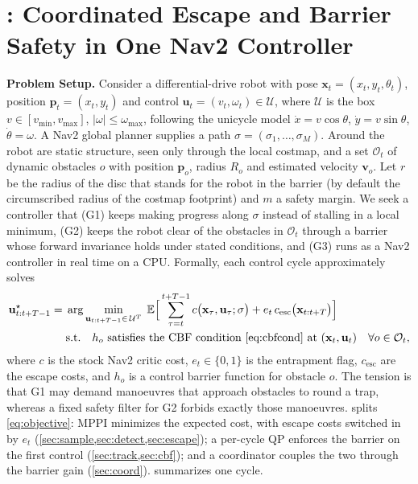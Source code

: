 \section{\sname: Coordinated Escape and Barrier Safety in One Nav2 Controller}\label{sec:method}

\noindent\textbf{Problem Setup.} Consider a differential-drive robot with pose $\mathbf{x}_t=(x_t,y_t,\theta_t)$, position $\mathbf{p}_t=(x_t,y_t)$ and control $\mathbf{u}_t=(v_t,\omega_t)\in\mathcal{U}$, where $\mathcal{U}$ is the box $v\in[v_{\min},v_{\max}]$, $|\omega|\le\omega_{\max}$, following the unicycle model $\dot x=v\cos\theta$, $\dot y=v\sin\theta$, $\dot\theta=\omega$. A Nav2 global planner supplies a path $\sigma=(\sigma_1,\dots,\sigma_M)$. Around the robot are static structure, seen only through the local costmap, and a set $\mathcal{O}_t$ of dynamic obstacles $o$ with position $\mathbf{p}_o$, radius $R_o$ and estimated velocity $\mathbf{v}_o$. Let $r$ be the radius of the disc that stands for the robot in the barrier (by default the circumscribed radius of the costmap footprint) and $m$ a safety margin. We seek a controller that (G1) keeps making progress along $\sigma$ instead of stalling in a local minimum, (G2) keeps the robot clear of the obstacles in $\mathcal{O}_t$ through a barrier whose forward invariance holds under stated conditions, and (G3) runs as a Nav2 controller in real time on a CPU. Formally, each control cycle approximately solves
\begin{equation}\label{eq:objective}
\begin{aligned}
\mathbf{u}^\star_{t:t+T-1}=\;&\arg\min_{\mathbf{u}_{t:t+T-1}\in\,\mathcal{U}^{T}}\;
\mathbb{E}\Big[\sum_{\tau=t}^{t+T-1} c\big(\mathbf{x}_\tau,\mathbf{u}_\tau;\sigma\big)
+ e_t\,c_{\mathrm{esc}}\big(\mathbf{x}_{t:t+T}\big)\Big]\\
&\text{s.t.}\quad h_o\ \text{satisfies the CBF condition \eqref{eq:cbfcond} at }(\mathbf{x}_t,\mathbf{u}_t)\quad\forall o\in\mathcal{O}_t ,
\end{aligned}
\end{equation}
where $c$ is the stock Nav2 critic cost, $e_t\in\{0,1\}$ is the entrapment flag, $c_{\mathrm{esc}}$ are the escape costs, and $h_o$ is a control barrier function for obstacle $o$. The tension is that G1 may demand manoeuvres that approach obstacles to round a trap, whereas a fixed safety filter for G2 forbids exactly those manoeuvres. \sname{} splits \eqref{eq:objective}: MPPI minimizes the expected cost, with escape costs switched in by $e_t$ (\cref{sec:sample,sec:detect,sec:escape}); a per-cycle QP enforces the barrier on the first control (\cref{sec:track,sec:cbf}); and a coordinator couples the two through the barrier gain (\cref{sec:coord}).  summarizes one cycle.

